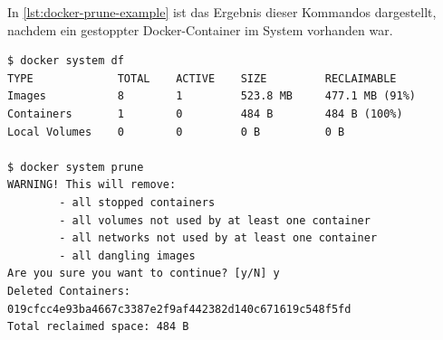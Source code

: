 In \cref{lst:docker-prune-example} ist das Ergebnis dieser Kommandos dargestellt, nachdem ein gestoppter Docker-Container im System vorhanden war.
\begin{lstlisting}[caption=Docker-Prune-Beispiel, label=lst:docker-prune-example]
$ docker system df
TYPE             TOTAL    ACTIVE    SIZE         RECLAIMABLE
Images           8        1         523.8 MB     477.1 MB (91%)
Containers       1        0         484 B        484 B (100%)
Local Volumes    0        0         0 B          0 B

$ docker system prune
WARNING! This will remove:
        - all stopped containers
        - all volumes not used by at least one container
        - all networks not used by at least one container
        - all dangling images
Are you sure you want to continue? [y/N] y
Deleted Containers:
019cfcc4e93ba4667c3387e2f9af442382d140c671619c548f5fd
Total reclaimed space: 484 B
\end{lstlisting}
